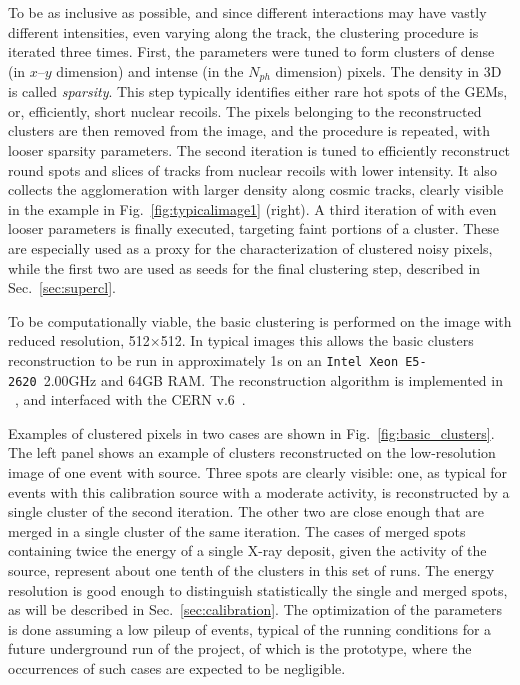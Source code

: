 To be as inclusive as possible, and since different interactions may
have vastly different intensities, even varying along the track, the
clustering procedure is iterated three times.  First, the \dbscan
parameters were tuned to form clusters of dense (in $x$--$y$ dimension)
and intense (in the $N_{ph}$ dimension) pixels. The density in 3D is
called \textit{sparsity}.  This step typically identifies either rare
hot spots of the GEMs, or, efficiently, short nuclear recoils. The
pixels belonging to the reconstructed clusters are then removed from
the image, and the \dbscan procedure is repeated, with looser sparsity
parameters. The second iteration is tuned to efficiently reconstruct
\fe round spots and slices of tracks from nuclear recoils with lower
intensity. It also collects the agglomeration with larger density
along cosmic tracks, clearly visible in the example in
Fig.~\ref{fig:typicalimage1} (right).  A third iteration of \dbscan
with even looser parameters is finally executed, targeting faint
portions of a cluster. These are especially used as a proxy for the
characterization of clustered noisy pixels, while the first two are
used as seeds for the final clustering step, described in
Sec.~\ref{sec:supercl}.

To be computationally viable, the \idbscan basic clustering is
performed on the image with reduced resolution, 512$\times$512. In
typical images this allows the basic clusters reconstruction to be run
in approximately 1\unit{s} on an \texttt{Intel Xeon
E5-2620}~2.00\unit{GHz} and 64\unit{GB} RAM. The reconstruction
algorithm is implemented in \PYTHONthree~\cite{python3}, and
interfaced with the CERN \ROOT v.6~\cite{root}.


Examples of clustered pixels in two cases are shown in
Fig.~\ref{fig:basic_clusters}. The left panel shows an example of
clusters reconstructed on the low-resolution image of one event
with \fe source. Three spots are clearly visible: one, as typical for
events with this calibration source with a moderate activity, is
reconstructed by a single cluster of the second iteration. The other
two are close enough that are merged in a single cluster of the same
iteration. The cases of merged spots containing twice the energy of a
single X-ray deposit, given the activity of the \fe source, represent
about one tenth of the clusters in this set of runs. The energy
resolution is good enough to distinguish statistically the single and
merged spots, as will be described in Sec.~\ref{sec:calibration}.  The
optimization of the \idbscan parameters is done assuming a low pileup
of events, typical of the running conditions for a future underground
run of the \cygno project, of which \lemon is the prototype, where the
occurrences of such cases are expected to be negligible.

